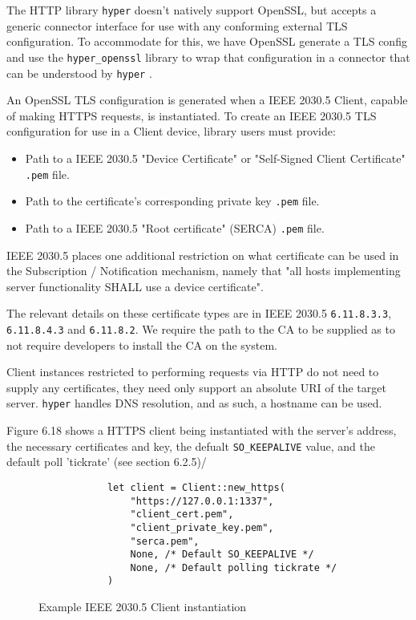 The HTTP library \texttt{hyper} doesn't natively support OpenSSL, but accepts a generic connector interface for use with any conforming external TLS configuration. To accommodate for this, we have OpenSSL generate a TLS config and use the \texttt{hyper\_openssl} library to wrap that configuration in a connector that can be understood by \texttt{hyper} \cite{hyperopenssl}. 

An OpenSSL TLS configuration is generated when a IEEE 2030.5 Client, capable of making HTTPS requests, is instantiated. To create an IEEE 2030.5 TLS configuration for use in a Client device, library users must provide:

\begin{itemize}
    \item Path to a IEEE 2030.5 "Device Certificate" or "Self-Signed Client Certificate" \texttt{.pem} file.
    \item Path to the certificate's corresponding private key \texttt{.pem} file.
    \item Path to a IEEE 2030.5 "Root certificate" (SERCA) \texttt{.pem} file. 
\end{itemize}

IEEE 2030.5 places one additional restriction on what certificate can be used in the Subscription / Notification mechanism, namely that "all hosts implementing server functionality SHALL use a device certificate".

The relevant details on these certificate types are in IEEE 2030.5 \texttt{6.11.8.3.3}, \texttt{6.11.8.4.3} and \texttt{6.11.8.2}. We require the path to the CA to be supplied as to not require developers to install the CA on the system.

Client instances restricted to performing requests via HTTP do not need to supply any certificates, they need only support an absolute URI of the target server. \texttt{hyper} handles DNS resolution, and as such, a hostname can be used. 

Figure 6.18 shows a HTTPS client being instantiated with the server's address, the necessary certificates and key, the defualt \texttt{SO\_KEEPALIVE} value, and the default poll 'tickrate' (see section 6.2.5)/  

\begin{figure}[h]
    \begin{center}
        \begin{lstlisting}
            let client = Client::new_https(
                "https://127.0.0.1:1337",
                "client_cert.pem",
                "client_private_key.pem",
                "serca.pem",
                None, /* Default SO_KEEPALIVE */
                None, /* Default polling tickrate */
            )
        \end{lstlisting}
        \label{fig:httpsclientexample}
        \vspace{-10pt}
        \caption{Example IEEE 2030.5 Client instantiation}
    \end{center}
\end{figure}

